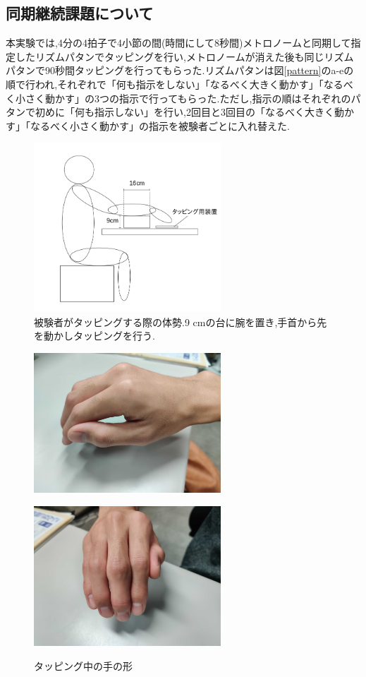 \documentclass[12pt]{jarticle}
\begin{document}
\subsection{同期継続課題について}
本実験では,4分の4拍子で4小節の間(時間にして8秒間)メトロノームと同期して指定したリズムパタンでタッピングを行い,メトロノームが消えた後も同じリズムパタンで90秒間タッピングを行ってもらった.リズムパタンは図\ref{pattern}のa-eの順で行われ,それぞれで「何も指示をしない」「なるべく大きく動かす」「なるべく小さく動かす」の3つの指示で行ってもらった.ただし,指示の順はそれぞれのパタンで初めに「何も指示しない」を行い,2回目と3回目の「なるべく大きく動かす」「なるべく小さく動かす」の指示を被験者ごとに入れ替えた.


\begin{figure}
  \centering
  \includegraphics[width=7cm]{subject.jpg}
  \caption{被験者がタッピングする際の体勢.9 cmの台に腕を置き,手首から先を動かしタッピングを行う.}
  \label{subject}
\end{figure}
\begin{figure}[htpb]
  \begin{minipage}{\hsize}
    \centering
    \includegraphics[width=7cm]{tapping_hand_1.jpg}
    \label{hand_1}
  \end{minipage}
  \begin{minipage}{\hsize}
    \centering
    \includegraphics[width=7cm]{tapping_hand_2.jpg}
    \label{hand_2}
  \end{minipage}
  \caption{タッピング中の手の形}
  \label{hand}
\end{figure}
\end{document}
